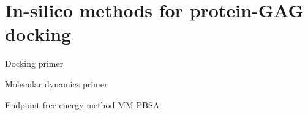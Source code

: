 \chapter{In-silico methods for protein-GAG docking}

Docking primer

Molecular dynamics primer

Endpoint free energy method MM-PBSA

\lipsum[1-10]
